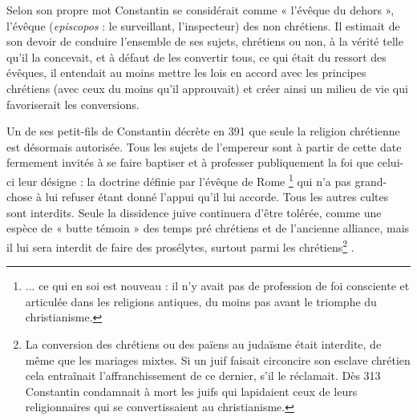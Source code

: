 Selon son propre mot Constantin se considérait comme « l'évêque du dehors », l'évêque (\emph{episcopos} : le surveillant, l'inspecteur) des non chrétiens. Il estimait de son devoir de conduire l'ensemble de ses sujets, chrétiens ou non, à la vérité telle qu'il la concevait, et à défaut de les convertir tous, ce qui était du ressort des évêques, il entendait au moins mettre les lois en accord avec les principes chrétiens (avec ceux du moins qu'il approuvait) et créer ainsi un milieu de vie qui favoriserait les conversions.
 


 Un de ses petit-fils de Constantin décrète en 391 que seule la religion chrétienne est désormais autorisée. Tous les sujets de l'empereur sont à partir de cette date fermement invités à se faire baptiser et à professer publiquement la foi que celui-ci leur désigne : la doctrine définie par l'évêque de Rome \footnote{... ce qui en soi est nouveau : il n'y avait pas de profession de foi consciente et articulée dans les religions antiques, du moins pas avant le triomphe du christianisme.}
qui n'a pas grand-chose à lui refuser étant donné l'appui qu'il lui accorde. Tous les autres cultes sont interdits. Seule la dissidence juive continuera d'être tolérée, comme une espèce de « butte témoin » des temps pré chrétiens et de l'ancienne alliance, mais il lui sera interdit de faire des prosélytes, surtout parmi les chrétiens\footnote{La conversion des chrétiens ou des païens au judaïsme était interdite, de même que les mariages mixtes. Si un juif faisait circoncire son esclave chrétien cela entraînait  l'affranchissement de ce dernier, s'il le réclamait. Dès 313 Constantin condamnait à mort les juifs qui lapidaient ceux de leurs religionnaires qui se convertissaient au christianisme.}%
. 

